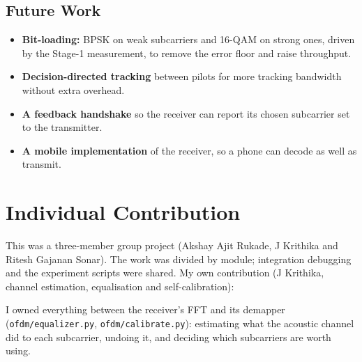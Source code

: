 \documentclass[11pt,a4paper]{report}
\begin{document}
\section{Future Work}
\begin{itemize}
    \item \textbf{Bit-loading:} BPSK on weak subcarriers and 16-QAM on strong ones,
    driven by the Stage-1 measurement, to remove the error floor and raise throughput.
    \item \textbf{Decision-directed tracking} between pilots for more tracking bandwidth
    without extra overhead.
    \item \textbf{A feedback handshake} so the receiver can report its chosen subcarrier
    set to the transmitter.
    \item \textbf{A mobile implementation} of the receiver, so a phone can decode as
    well as transmit.
\end{itemize}

\chapter{Individual Contribution}

This was a three-member group project (Akshay Ajit Rukade, J Krithika and Ritesh Gajanan Sonar). The work was divided by module;
integration debugging and the experiment scripts were shared. My own contribution
(J Krithika, channel estimation, equalisation and self-calibration):

I owned everything between the receiver's FFT and its demapper
(\texttt{ofdm/equalizer.py}, \texttt{ofdm/calibrate.py}): estimating what the acoustic
channel did to each subcarrier, undoing it, and deciding which subcarriers are
worth using.
\end{document}
